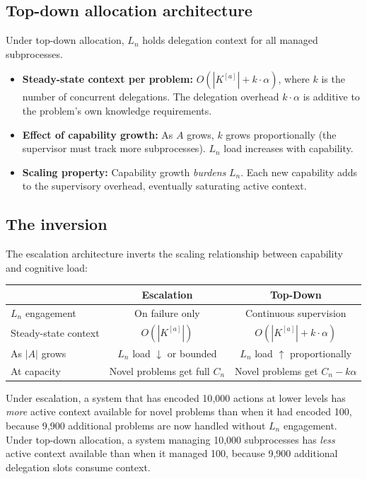 \documentclass[11pt]{article}
\theoremstyle{definition}
\begin{document}
\subsection{Top-down allocation architecture}

Under top-down allocation, $L_n$ holds delegation context for all
managed subprocesses.

\begin{itemize}
\item \textbf{Steady-state context per problem:}
   $O(|K^{[a]}| + k \cdot \alpha)$, where $k$ is the number of
   concurrent delegations. The delegation overhead $k \cdot \alpha$
   is additive to the problem's own knowledge requirements.

\item \textbf{Effect of capability growth:} As $A$ grows, $k$ grows
   proportionally (the supervisor must track more subprocesses).
   $L_n$ load increases with capability.

\item \textbf{Scaling property:} Capability growth \emph{burdens}
   $L_n$. Each new capability adds to the supervisory overhead,
   eventually saturating active context.
\end{itemize}

\subsection{The inversion}

The escalation architecture inverts the scaling relationship between
capability and cognitive load:

\begin{center}
\begin{tabular}{@{}lcc@{}}
\toprule
& \textbf{Escalation} & \textbf{Top-Down} \\
\midrule
$L_n$ engagement & On failure only & Continuous supervision \\
Steady-state context & $O(|K^{[a]}|)$ & $O(|K^{[a]}| + k \cdot
\alpha)$ \\
As $|A|$ grows & $L_n$ load $\downarrow$ or bounded &
$L_n$ load $\uparrow$ proportionally \\
At capacity & Novel problems get full $C_n$ &
Novel problems get $C_n - k\alpha$ \\
\bottomrule
\end{tabular}
\end{center}

Under escalation, a system that has encoded 10{,}000 actions at lower
levels has \emph{more} active context available for novel problems than
when it had encoded 100, because 9{,}900 additional problems are
now handled without $L_n$ engagement. Under top-down allocation, a
system managing 10{,}000 subprocesses has \emph{less} active context
available than when it managed 100, because 9{,}900 additional
delegation slots consume context.
\end{document}
